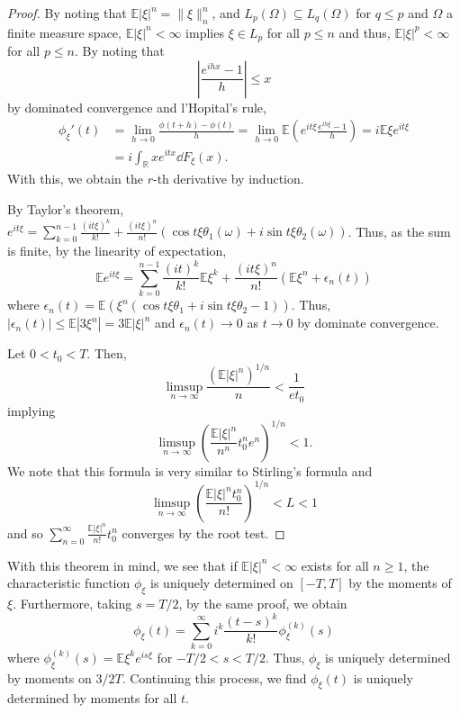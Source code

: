 \documentclass[]{article}
\theoremstyle{definition}
\theoremstyle{definition}
\begin{document}
\begin{proof}
  By noting that \(\mathbb{E}|\xi|^n = \|\xi\|_n^n\), and 
  \(L_p(\Omega) \subseteq L_q(\Omega)\) for \(q \le p\) and \(\Omega\) a finite 
  measure space, \(\mathbb{E}|\xi|^n < \infty\) implies \(\xi \in L_p\) for all 
  \(p \le n\) and thus, \(\mathbb{E}|\xi|^p < \infty\) for all \(p \le n\). 
  By noting that 
  \[\left|\frac{e^{ihx} - 1}{h}\right| \le x\]
  by dominated convergence and l'Hopital's rule,
  \[\begin{split}
    \phi_\xi'(t) &= \lim_{h \to 0} \frac{\phi(t + h) - \phi(t)}{h} 
      = \lim_{h \to 0}\mathbb{E}\left(e^{it\xi} \frac{e^{ih\xi} - 1}{h}\right)
      = i\mathbb{E}\xi e^{it\xi}\\
    & = i\int_{\mathbb{R}} x e^{itx} \dd F_\xi(x).
  \end{split}\]
  With this, we obtain the \(r\)-th derivative by induction.

  By Taylor's theorem, \(e^{it\xi} = \sum_{k = 0}^{n - 1}\frac{(it\xi)^k}{k!} + 
  \frac{(it\xi)^n}{n!}(\cos t \xi \theta_1(\omega) + i\sin t \xi \theta_2(\omega))\).
  Thus, as the sum is finite, by the linearity of expectation,
  \[\mathbb{E}e^{it\xi} = \sum_{k = 0}^{n - 1}\frac{(it)^k}{k!}\mathbb{E}\xi^k + 
  \frac{(it\xi)^n}{n!}(\mathbb{E}\xi^n + \epsilon_n(t))\]
  where \(\epsilon_n(t) = \mathbb{E}(\xi^n (\cos t \xi \theta_1 + i\sin t\xi \theta_2 - 1))\).
  Thus, \(|\epsilon_n(t)| \le \mathbb{E}|3\xi^n| = 3\mathbb{E}|\xi|^n\) 
  and \(\epsilon_n(t) \to 0\) as \(t \to 0\) by dominate convergence.

  Let \(0 < t_0 < T\). Then, 
  \[\limsup_{n \to \infty} \frac{(\mathbb{E}|\xi|^n)^{1 / n}}{n} < \frac{1}{et_0}\]
  implying 
  \[\limsup_{n \to \infty}\left(\frac{\mathbb{E}|\xi|^n}{n^n} t_0^n e^n\right)^{1 / n} < 1.\]
  We note that this formula is very similar to Stirling's formula and 
  \[\limsup_{n \to \infty}\left(\frac{\mathbb{E}|\xi|^n t_0^n}{n!}\right)^{1 / n} < L < 1\]
  and so \(\sum_{n = 0}^\infty \frac{\mathbb{E}|\xi|^n}{n!} t_0^n\) converges 
  by the root test.
\end{proof}

With this theorem in mind, we see that if \(\mathbb{E}|\xi|^n < \infty\) 
exists for all \(n \ge 1\), the characteristic function \(\phi_\xi\) is 
uniquely determined on \([-T, T]\) by the moments of \(\xi\). Furthermore, 
taking \(s = T / 2\), by the same proof, we obtain 
\[\phi_\xi(t) = \sum_{k = 0}^\infty i^k \frac{(t - s)^k}{k!}\phi_\xi^{(k)}(s)\]
where \(\phi_\xi^{(k)}(s) = \mathbb{E}\xi^k e^{is\xi}\) for \(- T/2 < s < T/2\). 
Thus, \(\phi_\xi\) is uniquely determined by moments on \(3 / 2 T\). Continuing 
this process, we find \(\phi_\xi(t)\) is uniquely determined by moments for all 
\(t\). 
\end{document}

